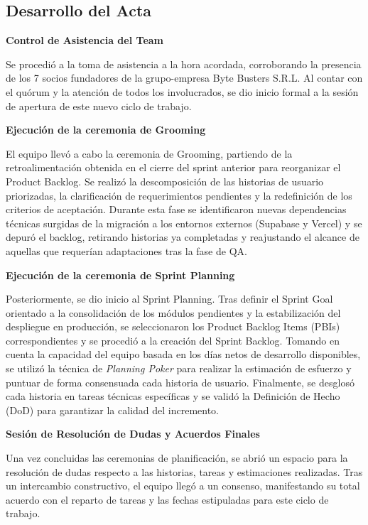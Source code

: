\newpage
\subsection{Desarrollo del Acta}

\noindent \textbf{Control de Asistencia del Team}\par
Se procedió a la toma de asistencia a la hora acordada, corroborando la presencia de los 7 socios fundadores de la grupo-empresa Byte Busters S.R.L. Al contar con el quórum y la atención de todos los involucrados, se dio inicio formal a la sesión de apertura de este nuevo ciclo de trabajo.

\vspace*{0.5cm}
\noindent \textbf{Ejecución de la ceremonia de Grooming}\par
El equipo llevó a cabo la ceremonia de Grooming, partiendo de la retroalimentación obtenida en el cierre del sprint anterior para reorganizar el Product Backlog. Se realizó la descomposición de las historias de usuario priorizadas, la clarificación de requerimientos pendientes y la redefinición de los criterios de aceptación. Durante esta fase se identificaron nuevas dependencias técnicas surgidas de la migración a los entornos externos (Supabase y Vercel) y se depuró el backlog, retirando historias ya completadas y reajustando el alcance de aquellas que requerían adaptaciones tras la fase de QA.

\vspace*{0.5cm}
\noindent \textbf{Ejecución de la ceremonia de Sprint Planning}\par
Posteriormente, se dio inicio al Sprint Planning. Tras definir el Sprint Goal orientado a la consolidación de los módulos pendientes y la estabilización del despliegue en producción, se seleccionaron los Product Backlog Items (PBIs) correspondientes y se procedió a la creación del Sprint Backlog. Tomando en cuenta la capacidad del equipo basada en los días netos de desarrollo disponibles, se utilizó la técnica de \textit{Planning Poker} para realizar la estimación de esfuerzo y puntuar de forma consensuada cada historia de usuario. Finalmente, se desglosó cada historia en tareas técnicas específicas y se validó la Definición de Hecho (DoD) para garantizar la calidad del incremento.

\vspace*{0.5cm}
\noindent \textbf{Sesión de Resolución de Dudas y Acuerdos Finales}\par
Una vez concluidas las ceremonias de planificación, se abrió un espacio para la resolución de dudas respecto a las historias, tareas y estimaciones realizadas. Tras un intercambio constructivo, el equipo llegó a un consenso, manifestando su total acuerdo con el reparto de tareas y las fechas estipuladas para este ciclo de trabajo.

